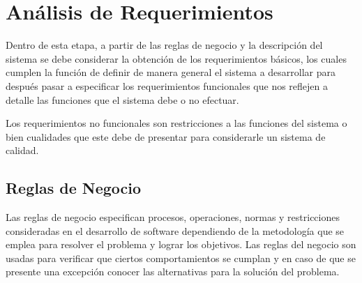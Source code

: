 \newpage
\section{Análisis de Requerimientos}

Dentro de esta etapa, a partir de las reglas de negocio y la descripción del sistema se debe considerar la obtención de los requerimientos básicos, los cuales cumplen la función de definir de manera general el sistema a desarrollar para después pasar a especificar los requerimientos funcionales que nos reflejen a detalle las funciones que el sistema debe o no efectuar.

Los requerimientos no funcionales son restricciones a las funciones del sistema o bien cualidades que este debe de presentar para considerarle un sistema de calidad.

\subsection{Reglas de Negocio}

Las reglas de negocio especifican procesos, operaciones, normas y restricciones consideradas en el desarrollo de software dependiendo de la metodología que se emplea para resolver el problema y lograr los objetivos. Las reglas del negocio son usadas para verificar que ciertos comportamientos se cumplan y en caso de que se presente una excepción conocer las alternativas para la solución del problema.

